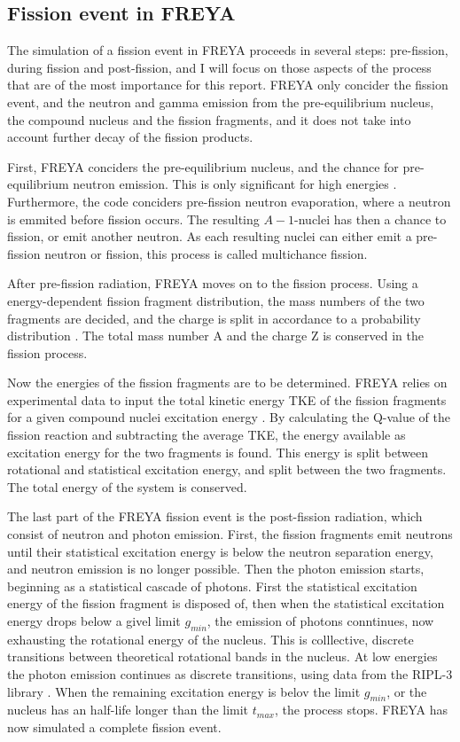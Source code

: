 \documentclass[]{article}
\begin{document}
\subsection{Fission event in FREYA}
\label{Fission_FREYA}

The simulation of a fission event in FREYA proceeds in several steps: pre-fission, during fission and post-fission, and I will focus on those aspects of the process that are of the most importance for this report. FREYA only concider the fission event, and the neutron and gamma emission from the pre-equilibrium nucleus, the compound nucleus and the fission fragments, and it does not take into account further decay of the fission products.

First, FREYA conciders the pre-equilibrium nucleus, and the chance for pre-equilibrium neutron emission. This is only significant for high energies \cite{FREYAusemanual}. Furthermore, the code conciders pre-fission neutron evaporation, where a neutron is emmited before fission occurs. The resulting $A-1$-nuclei has then a chance to fission, or emit another neutron. As each resulting nuclei can either emit a pre-fission neutron or fission, this process is called multichance fission.

After pre-fission radiation, FREYA moves on to the fission process. Using a energy-dependent fission fragment distribution, the mass numbers of the two fragments are decided, and the charge is split in accordance to a probability distribution \cite{FREYAusemanual}. The total mass number A and the charge Z is conserved in the fission process.

Now the energies of the fission fragments are to be determined. FREYA relies on experimental data to input the total kinetic energy TKE of the fission fragments for a given compound nuclei excitation energy \cite{FREYAusemanual}. By calculating the Q-value of the fission reaction and subtracting the average TKE, the energy available as excitation energy for the two fragments is found. This energy is split between rotational and statistical excitation energy, and split between the two fragments. The total energy of the system is conserved. 

The last part of the FREYA fission event is the post-fission radiation, which consist of neutron and photon emission. First, the fission fragments emit neutrons until their statistical excitation energy is below the neutron separation energy, and neutron emission is no longer possible. Then the photon emission starts, beginning as a statistical cascade of photons. First the statistical excitation energy of the fission fragment is disposed of, then when the statistical excitation energy drops below a givel limit $g_{min}$, the emission of photons conntinues, now exhausting the rotational energy of the nucleus. This is colllective, discrete transitions between theoretical rotational bands in the nucleus. At low energies the photon emission continues as discrete transitions, using data from the RIPL-3 library \cite{FREYAusemanual}. When the remaining excitation energy is belov the limit $g_{min}$, or the nucleus has an half-life longer than the limit $t_{max}$, the process stops. FREYA has now simulated a complete fission event.
\end{document}

